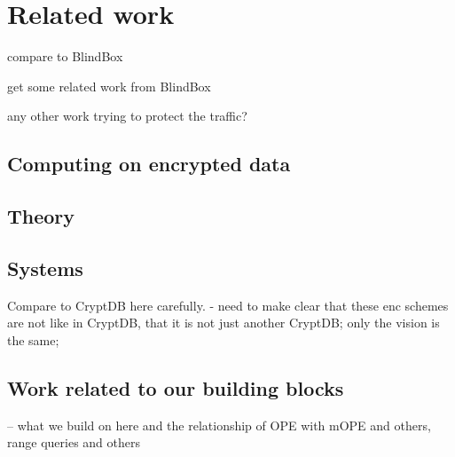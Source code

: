 
\section{Related work}\label{sec:related}

compare to BlindBox

get some related work from BlindBox

any other work trying to protect the traffic? 

\subsection{Computing on encrypted data}

\subsection{Theory}


\subsection{Systems}

Compare to CryptDB here carefully. 
- need to make clear that these enc schemes are not like in CryptDB, that it is not just another CryptDB; only the vision is the same; %


\subsection{Work related to our building blocks}

-- what we build on here and the relationship of OPE with mOPE and others, range queries and others

